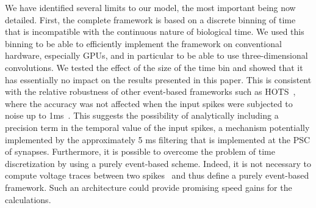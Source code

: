 \documentclass[default]{sn-jnl}%
\theoremstyle{thmstyleone}%
\theoremstyle{thmstyletwo}%
\theoremstyle{thmstylethree}%
\begin{document}
We have identified several limits to our model, the most important being now detailed. First, the complete framework is based on a discrete binning of time that is incompatible with the continuous nature of biological time. We used this binning to be able to efficiently implement the framework on conventional hardware, especially GPUs, and in particular to be able to use three-dimensional convolutions. We tested the effect of the size of the time bin and showed that it has essentially no impact on the results presented in this paper. This is consistent with the relative robustness of other event-based frameworks such as HOTS~\citep{lagorce_hots_2017}, where the accuracy was not affected when the input spikes were subjected to noise up to 1ms~\citep{grimaldi_robust_2022}. This suggests the possibility of analytically including a precision term in the temporal value of the input spikes, a mechanism potentially implemented by the approximately 5 ms filtering that is implemented at the PSC of synapses. Furthermore, it is possible to overcome the problem of time discretization by using a purely event-based scheme. Indeed, it is not necessary to compute voltage traces between two spikes~\citep{hanuschkin_general_2010} and thus define a purely event-based framework. Such an architecture could provide promising speed gains for the calculations.
\end{document}
